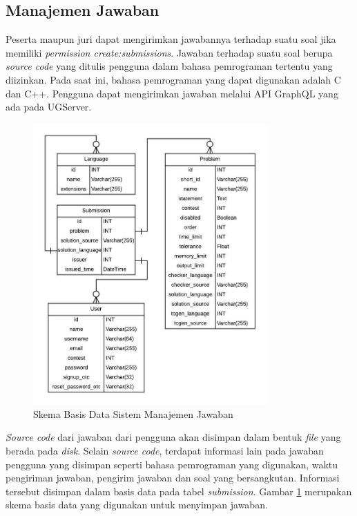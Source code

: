\subsection{Manajemen Jawaban}

\par Peserta maupun juri dapat mengirimkan jawabannya terhadap suatu soal jika memiliki \textit{permission create:submissions}. Jawaban terhadap suatu soal berupa \textit{source code} yang ditulis pengguna dalam bahasa pemrograman tertentu yang diizinkan. Pada saat ini, bahasa pemrograman yang dapat digunakan adalah C dan C++. Pengguna dapat mengirimkan jawaban melalui API GraphQL yang ada pada UGServer.

\begin{figure}[ht!]
    \centering
    \includegraphics[width=0.8\textwidth]{images/submission-schema}
    \caption{Skema Basis Data Sistem Manajemen Jawaban}
    \label{fig:submission-schema}
\end{figure}

\par \textit{Source code} dari jawaban dari pengguna akan disimpan dalam bentuk \textit{file} yang berada pada \textit{disk}. Selain \textit{source code}, terdapat informasi lain pada jawaban pengguna yang disimpan seperti bahasa pemrograman yang digunakan, waktu pengiriman jawaban, pengirim jawaban dan soal yang bersangkutan. Informasi tersebut disimpan dalam basis data pada tabel \textit{submission}. Gambar \ref{fig:submission-schema} merupakan skema basis data yang digunakan untuk menyimpan jawaban.

